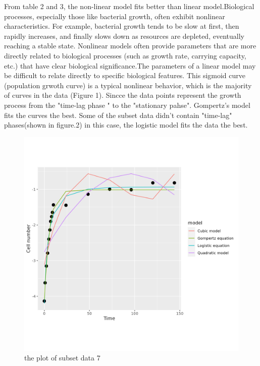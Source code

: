 \documentclass{article}
\begin{document}
From table 2 and 3, the non-linear model fits better than linear model.Biological processes, especially those like bacterial growth, often exhibit nonlinear characteristics. For example, bacterial growth tends to be slow at first, then rapidly increases, and finally slows down as resources are depleted, eventually reaching a stable state. Nonlinear models often provide parameters that are more directly related to biological processes\cite{zwietering1990} (such as growth rate, carrying capacity, etc.) that have clear biological significance.The parameters of a linear model may be difficult to relate directly to specific biological features.
This sigmoid curve (population grwoth curve) is a typical nonlinear behavior, which is the majority of curves in the data (Figure 1).  Sincce the data points represent the growth process from the "time-lag phase " to the "stationary pahse". Gompertz's model fits the curves the best. 
Some of the subset data didn't contain "time-lag" phases(shown in figure.2) in this case, the logistic model fits the data the best.
\begin{figure}
        \centering
        \includegraphics[width=0.5\linewidth]{../results/subset_ 7 _plot.png}
        \caption{the plot of subset data 7 }
        \label{fig:subset1-plot7}
    \end{figure}
\end{document}
